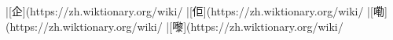 |[企](https://zh.wiktionary.org/wiki/%
|[佢](https://zh.wiktionary.org/wiki/%
|[嘞](https://zh.wiktionary.org/wiki/%
|[嚟](https://zh.wiktionary.org/wiki/%
